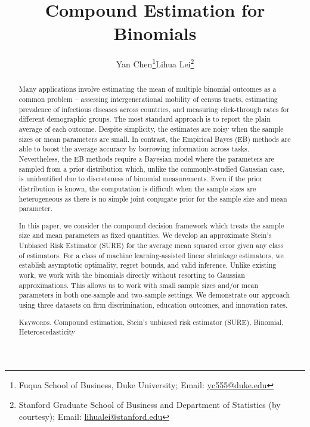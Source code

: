 \documentclass[12pt,letterpaper]{article}
\title{Compound Estimation for Binomials
}
\author{Yan Chen\thanks{Fuqua School of Business, Duke University; Email: \href{mailto:yc555@duke.edu}{yc555@duke.edu}}\quad\quad Lihua Lei\thanks{Stanford Graduate School of Business and Department of Statistics (by courtesy); Email: \href{mailto:lihualei@stanford.edu}{lihualei@stanford.edu}}}
\date{ }
\begin{document}
\maketitle

\onehalfspacing
\begin{abstract}
Many applications involve estimating the mean of multiple binomial outcomes as a common problem -- assessing intergenerational mobility of census tracts, estimating prevalence of infectious diseases across countries, and measuring click-through rates for different  demographic groups. The most standard approach is to report the plain average of each outcome. Despite simplicity, the estimates are noisy when the sample sizes or mean parameters are small. In contrast, the Empirical Bayes (EB) methods are able to boost the average accuracy by borrowing information across tasks. Nevertheless, 
the EB methods require a Bayesian model where the parameters are sampled from a prior distribution which, unlike the commonly-studied Gaussian case, is unidentified due to discreteness of binomial measurements. Even if the prior distribution is known, the computation is difficult when the sample sizes are heterogeneous as there is no simple joint conjugate 
prior for the sample size and mean parameter. 

In this paper, we consider the compound decision framework which treats the sample size and mean parameters as fixed quantities. We develop an approximate Stein's Unbiased Risk Estimator (SURE) for the average mean squared error given any class of estimators. For a class of machine learning-assisted linear shrinkage estimators, we establish asymptotic optimality, regret bounds, and valid inference. Unlike existing work, we work with the binomials directly without resorting to Gaussian approximations. This allows us to  work with small sample sizes and/or mean parameters in both one-sample and two-sample settings. We demonstrate our approach using three datasets on firm discrimination, education outcomes, and innovation rates.


\vspace{1em}
\noindent \textsc{Keywords.} Compound estimation, Stein's unbiased risk estimator (SURE), Binomial, Heteroscedasticity
\end{abstract}
\end{document}
